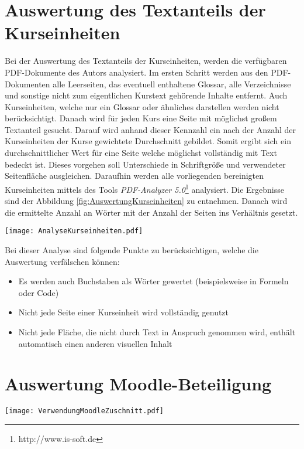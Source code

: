 \section{Auswertung des Textanteils der Kurseinheiten}
Bei der Auswertung des Textanteils der Kurseinheiten, werden die verfügbaren PDF-Dokumente des Autors analysiert. Im ersten Schritt werden aus den PDF-Dokumenten alle Leerseiten, das eventuell enthaltene Glossar, alle Verzeichnisse und sonstige nicht zum eigentlichen Kurstext gehörende Inhalte entfernt. Auch Kurseinheiten, welche nur ein Glossar oder ähnliches darstellen werden nicht berücksichtigt. Danach wird für jeden Kurs eine Seite mit möglichst großem Textanteil gesucht. Darauf wird anhand dieser Kennzahl ein nach der Anzahl der Kurseinheiten der Kurse gewichtete Durchschnitt gebildet. Somit ergibt sich ein durchschnittlicher Wert für eine Seite welche möglichst vollständig mit Text bedeckt ist. Dieses vorgehen soll Unterschiede in Schriftgröße und verwendeter Seitenfläche ausgleichen.
Daraufhin werden alle vorliegenden bereinigten Kurseinheiten mittels des Tools \textit{PDF-Analyzer 5.0}\footnote{http://www.is-soft.de} analysiert. Die Ergebnisse sind der Abbildung \ref{fig:AuswertungKurseinheiten} zu entnehmen. Danach wird die ermittelte Anzahl an Wörter mit der Anzahl der Seiten ins Verhältnis gesetzt.

\begin{sidewaysfigure}
\texttt{[image: AnalyseKurseinheiten.pdf]}
\caption{\label{fig:AuswertungKurseinheiten}Analyse der Kurseinheiten}
\end{sidewaysfigure}


Bei dieser Analyse sind folgende Punkte zu berücksichtigen, welche die Auswertung verfälschen können:
\begin{itemize}
\item Es werden auch Buchstaben als Wörter gewertet (beispielsweise in Formeln oder Code)
\item Nicht jede Seite einer Kurseinheit wird vollständig genutzt
\item Nicht jede Fläche, die nicht durch Text in Anspruch genommen wird, enthält automatisch einen anderen visuellen Inhalt
\end{itemize}

\section{Auswertung Moodle-Beteiligung}

\begin{sidewaysfigure}
\texttt{[image: VerwendungMoodleZuschnitt.pdf]}
\caption{\label{fig:VerwendungMoodle}Verwendung von Moodle in den Pflichtmodulen des Bachelorstudiengangs Wirtschaftsinformatik (Sommersemester 2018)}
\end{sidewaysfigure}